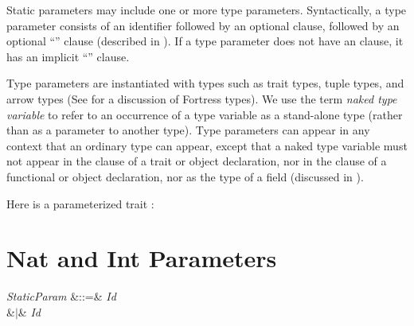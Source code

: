 Static parameters may include one or more type parameters.
Syntactically, a type parameter consists of an identifier followed by an
optional  clause, followed by an optional
``'' clause (described in
).
If a type parameter does not have an  clause, it has an
implicit ``'' clause.


Type parameters are instantiated with types such as trait types, tuple types,
and arrow types (See  for a discussion of Fortress
types).  We use the term \emph{naked type variable} to refer to an
occurrence of a type variable as a stand-alone type (rather than as
a parameter to another type).  Type parameters can appear in any context
that an ordinary type can appear, except that a naked type variable must not
appear in the  clause of a trait or object declaration,
nor in the  clause of a functional or object declaration,
nor as the type of a  field (discussed in ).


Here is a parameterized trait :



\section{Nat and Int Parameters}

\begin{Grammar}
\emph{StaticParam} &::=&  \emph{Id} \\
&$|$&  \emph{Id} \\
\end{Grammar}


